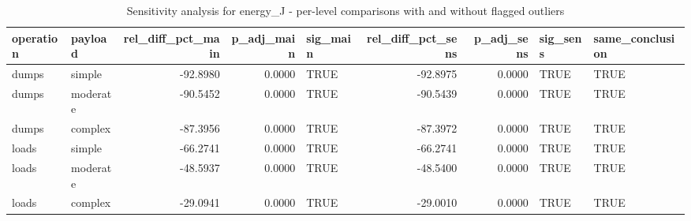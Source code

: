\begin{table}[ht]
\centering
\begin{tabular}{llrrlrrll}
  \toprule
operation & payload & rel\_diff\_pct\_main & p\_adj\_main & sig\_main & rel\_diff\_pct\_sens & p\_adj\_sens & sig\_sens & same\_conclusion \\ 
  \midrule
dumps & simple & -92.8980 & 0.0000 & TRUE & -92.8975 & 0.0000 & TRUE & TRUE \\ 
  dumps & moderate & -90.5452 & 0.0000 & TRUE & -90.5439 & 0.0000 & TRUE & TRUE \\ 
  dumps & complex & -87.3956 & 0.0000 & TRUE & -87.3972 & 0.0000 & TRUE & TRUE \\ 
  loads & simple & -66.2741 & 0.0000 & TRUE & -66.2741 & 0.0000 & TRUE & TRUE \\ 
  loads & moderate & -48.5937 & 0.0000 & TRUE & -48.5400 & 0.0000 & TRUE & TRUE \\ 
  loads & complex & -29.0941 & 0.0000 & TRUE & -29.0010 & 0.0000 & TRUE & TRUE \\ 
   \bottomrule
\end{tabular}
\caption{Sensitivity analysis for energy_J - per-level comparisons with and without flagged outliers} 
\label{tab:sens_RQ1_energy_pairwise}
\end{table}
